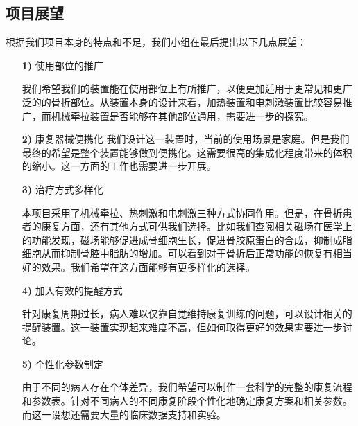 \documentclass[UTF8]{ctexart}
\begin{document}
    \subsection{项目展望}
        根据我们项目本身的特点和不足，我们小组在最后提出以下几点展望：
        \begin{enumerate}
            \item[\textbf{1)}]使用部位的推广
    
                我们希望我们的装置能在使用部位上有所推广，以便更加适用于更常见和更广泛的的骨折部位。从装置本身的设计来看，加热装置和电刺激装置比较容易推广，而机械牵拉装置是否能够在其他部位通用，需要进一步的探究。
            

            \item[\textbf{2)}]康复器械便携化
                我们设计这一装置时，当前的使用场景是家庭。但是我们最终的希望是整个装置能够做到便携化。这需要很高的集成化程度带来的体积的缩小。这一方面的工作也需要进一步开展。 

            \item[\textbf{3)}]治疗方式多样化
            
            本项目采用了机械牵拉、热刺激和电刺激三种方式协同作用。但是，在骨折患者的康复方面，还有其他方式可供我们选择。比如我们查阅相关磁场在医学上的功能发现，磁场能够促进成骨细胞生长，促进骨胶原蛋白的合成，抑制成脂细胞从而抑制骨腔中脂肪的增加。可以看到对于骨折后正常功能的恢复有相当好的效果。我们希望在这方面能够有更多样化的选择。
            

            \item[\textbf{4)}]加入有效的提醒方式
                
                针对康复周期过长，病人难以仅靠自觉维持康复训练的问题，可以设计相关的提醒装置。这一装置实现起来难度不高，但如何取得更好的效果需要进一步讨论。
            
            \item[\textbf{5)}]个性化参数制定
                
                由于不同的病人存在个体差异，我们希望可以制作一套科学的完整的康复流程和参数表。针对不同病人的不同康复阶段个性化地确定康复方案和相关参数。而这一设想还需要大量的临床数据支持和实验。
        \end{enumerate}
    
\end{document}
